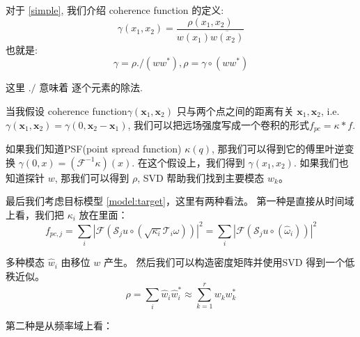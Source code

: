 \documentclass[12pt]{article}
\begin{document}
对于 \eqref{simple}, 我们介绍 coherence function 的定义:
$$
\gamma(x_1,x_2) = \dfrac{\rho(x_1,x_2)}{w(x_1) \overline{w(x_2)} }
$$
也就是:
\begin{equation}
\gamma = \rho ./ ( w w^*), \rho = \gamma \circ (ww^*) \label{eq: coherence}
\end{equation}


这里 $./$ 意味着 逐个元素的除法.

当我假设 coherence function$\gamma\left(\mathbf{x}_{1}, \mathbf{x}_{2}\right)$ 只与两个点之间的距离有关 $\mathbf{x}_{1}, \mathbf{x}_{2}$, i.e. $\gamma\left(\mathbf{x}_{1}, \mathbf{x}_{2}\right)=\gamma\left(0, \mathbf{x}_{2}-\mathbf{x}_{1}\right)$, 我们可以把远场强度写成一个卷积的形式\cite{psf}$f_{pc} = \kappa * f $. 

如果我们知道PSF(point spread function) $\kappa(q)$, 那我们可以得到它的傅里叶逆变换 $\gamma(0,x) = (\mathcal{F}^{-1}\kappa)(x)$. 在这个假设上，我们得到 $\gamma(x_1,x_2)$.  如果我们也知道探针 $w$, 那我们可以得到 $\rho$, SVD 帮助我们找到主要模态 $w_k$。


最后我们考虑目标模型 \eqref{model:target}，这里有两种看法。 第一种是直接从时间域上看，我们把 $\kappa_{i}$ 放在里面：
\begin{equation}
f_{p c, j}=\sum_{i} \left|\mathcal{F}\left( \mathcal{S}_{j} u \circ \left( \sqrt{\kappa_{i}}\mathcal{T}_{i} \omega\right) \right)\right|^{2}
=
\sum_{i} \left|\mathcal{F}\left( \mathcal{S}_{j} u \circ \left( \hat{\omega}_i\right) \right)\right|^{2}
\label{model:gradient decomposition}
\end{equation}

多种模态 $\hat{w}_i$ 由移位 $w$ 产生。 然后我们可以构造密度矩阵并使用SVD 得到一个低秩近似。
$$
\rho = \sum_i \hat{w}_i \hat{w}_i^* \approx \sum_{k=1}^{r} w_k w_k^* 
$$

第二种是从频率域上看：
\end{document}
